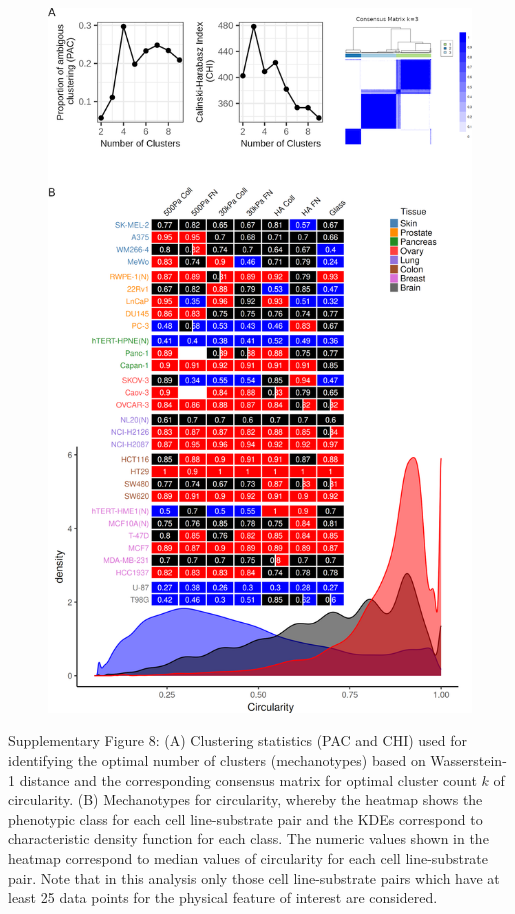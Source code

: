 \documentclass[11pt,letterpaper,english,oneside]{article} %
\begin{document}
\begin{figure}[H]
    \hspace*{-1cm}
    \centering
    \includegraphics[scale=0.282]{../Figures/Supplementary_Figure8/supplementary_figure8.png} 
    \caption{}
    \label{fig:fig8}
\end{figure}
\begin{adjustwidth}{1cm}{1cm}
Supplementary Figure 8: (A) Clustering statistics (PAC and CHI) used for identifying the optimal number of clusters (mechanotypes) based on Wasserstein-1 distance and the corresponding consensus matrix for optimal cluster count $k$
of circularity. (B) Mechanotypes for circularity, whereby the heatmap shows the phenotypic class for each cell line-substrate pair and the KDEs correspond to characteristic density function for each class. 
The numeric values shown in the heatmap correspond to median values of circularity for each cell line-substrate pair.
Note that in this analysis only those cell line-substrate pairs which have at least 25 data points for the physical feature of interest are considered.
\end{adjustwidth}
\end{document}
